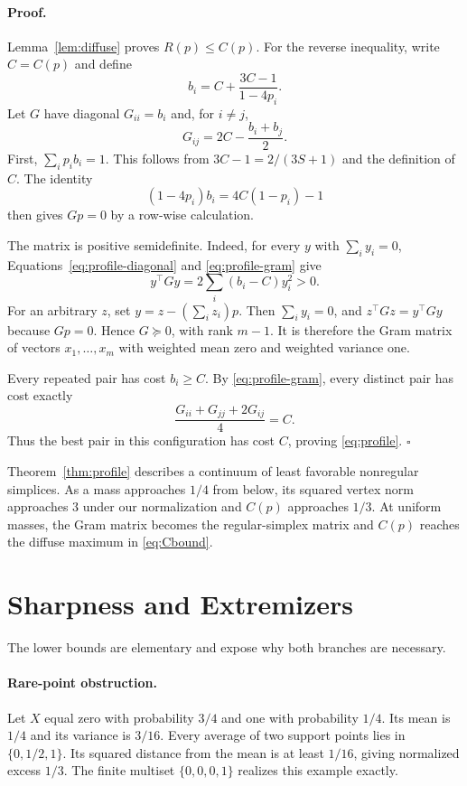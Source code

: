 \documentclass[twoside]{article}
\begin{document}
\paragraph{Proof.}
Lemma~\ref{lem:diffuse} proves $R(p)\leq C(p)$. For the reverse inequality, write $C=C(p)$ and define
\begin{equation}\label{eq:profile-diagonal}
 b_i=C+\frac{3C-1}{1-4p_i}.
\end{equation}
Let $G$ have diagonal $G_{ii}=b_i$ and, for $i\ne j$,
\begin{equation}\label{eq:profile-gram}
 G_{ij}=2C-\frac{b_i+b_j}{2}.
\end{equation}
First, $\sum_i p_i b_i=1$. This follows from $3C-1=2/(3S+1)$ and the definition of $C$. The identity \[ (1-4p_i)b_i=4C(1-p_i)-1 \] then gives $Gp=0$ by a row-wise calculation.

The matrix is positive semidefinite. Indeed, for every $y$ with $\sum_i y_i=0$, Equations~\eqref{eq:profile-diagonal} and \eqref{eq:profile-gram} give
\begin{equation}\label{eq:profile-psd}
 y^\top Gy=2\sum_i(b_i-C)y_i^2>0.
\end{equation}
For an arbitrary $z$, set $y=z-(\sum_i z_i)p$. Then $\sum_i y_i=0$, and $z^\top Gz=y^\top Gy$ because $Gp=0$. Hence $G\succeq0$, with rank $m-1$. It is therefore the Gram matrix of vectors $x_1,\ldots,x_m$ with weighted mean zero and weighted variance one.

Every repeated pair has cost $b_i\geq C$. By \eqref{eq:profile-gram}, every distinct pair has cost exactly \[ \frac{G_{ii}+G_{jj}+2G_{ij}}4=C. \] Thus the best pair in this configuration has cost $C$, proving \eqref{eq:profile}. \hfill$\square$

Theorem~\ref{thm:profile} describes a continuum of least favorable nonregular simplices. As a mass approaches $1/4$ from below, its squared vertex norm approaches $3$ under our normalization and $C(p)$ approaches $1/3$. At uniform masses, the Gram matrix becomes the regular-simplex matrix and $C(p)$ reaches the diffuse maximum in \eqref{eq:Cbound}.

\section{Sharpness and Extremizers}\label{sec:sharpness}

The lower bounds are elementary and expose why both branches are necessary.

\paragraph{Rare-point obstruction.}
Let $X$ equal zero with probability $3/4$ and one with probability $1/4$. Its mean is $1/4$ and its variance is $3/16$. Every average of two support points lies in $\{0,1/2,1\}$. Its squared distance from the mean is at least $1/16$, giving normalized excess $1/3$. The finite multiset $\{0,0,0,1\}$ realizes this example exactly.
\end{document}

